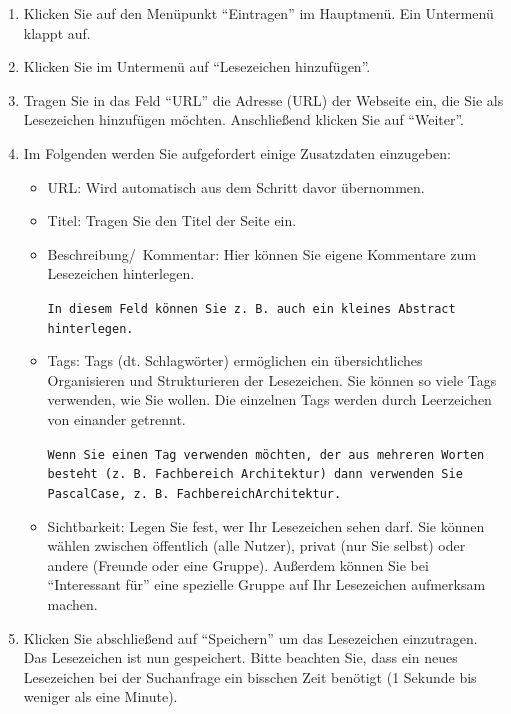 \begin{enumerate}
    \item Klicken Sie auf den Menüpunkt \enquote{Eintragen} im Hauptmenü. Ein Untermenü klappt auf.
    \item Klicken Sie im Untermenü auf \enquote{Lesezeichen hinzufügen}.
    \item Tragen Sie in das Feld \enquote{URL} die Adresse (URL) der Webseite ein, die Sie als Lesezeichen hinzufügen möchten. Anschließend klicken Sie auf \enquote{Weiter}. 
    \item Im Folgenden werden Sie aufgefordert einige Zusatzdaten einzugeben:
    \begin{itemize}
        \item URL: Wird automatisch aus dem Schritt davor übernommen.
        \item Titel: Tragen Sie den Titel der Seite ein. 
        \item Beschreibung/~Kommentar: Hier können Sie eigene Kommentare zum Lesezeichen hinterlegen. 
			\begin{mdframed}[style=mdfexample1,frametitle={\texttt{TIPP}},backgroundcolor=gray!40,linecolor=black]\texttt{In diesem Feld können Sie z. B. auch ein kleines Abstract hinterlegen.} 
			\end{mdframed}
        \item Tags: Tags (dt. Schlagwörter) ermöglichen ein übersichtliches Organisieren und Strukturieren der Lesezeichen. Sie können so viele Tags verwenden, wie Sie wollen. Die einzelnen Tags werden durch Leerzeichen von einander getrennt. \newline 
        	\begin{mdframed}[style=mdfexample1,frametitle={\texttt{TIPP}},backgroundcolor=gray!40]
	\texttt{Wenn Sie einen Tag verwenden möchten, der aus mehreren Worten besteht (z.~B. Fachbereich Architektur) dann verwenden Sie PascalCase, z.~B. FachbereichArchitektur.} 
			\end{mdframed}
        \item Sichtbarkeit: Legen Sie fest, wer Ihr Lesezeichen sehen darf. Sie können wählen zwischen öffentlich (alle Nutzer), privat (nur Sie selbst) oder andere (Freunde oder eine Gruppe). Außerdem können Sie bei \enquote{Interessant für} eine spezielle Gruppe auf Ihr Lesezeichen aufmerksam machen.  
    \end{itemize}
    \item Klicken Sie abschließend auf \enquote{Speichern} um das Lesezeichen einzutragen. Das Lesezeichen ist nun gespeichert. Bitte beachten Sie, dass ein neues Lesezeichen bei der Suchanfrage ein bisschen Zeit benötigt (1 Sekunde bis weniger als eine Minute). 
\end{enumerate}
